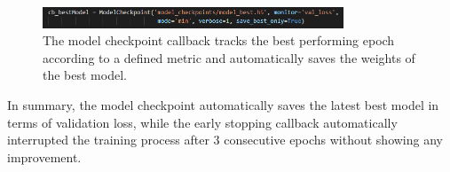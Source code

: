 \begin{figure}[H]
  \begin{center}
  \includegraphics[angle=0, width=0.8\textwidth]{Figures/ModelCheckpoint.PNG}
  \caption{The model checkpoint callback tracks the best performing epoch according to a defined metric and automatically saves the weights of the best model.}
  \label{fig:ModelCheckpoint}
  \end{center}
\end{figure}

In summary, the model checkpoint automatically saves the latest best model in terms of validation loss, while the early stopping callback automatically interrupted the training process after 3 consecutive epochs without showing any improvement.